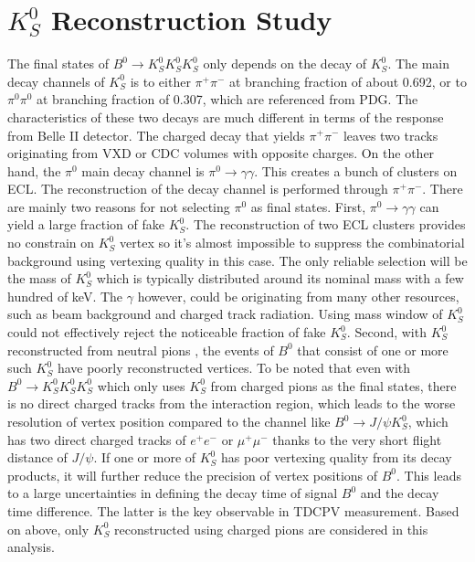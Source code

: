\chapter{$K_S^0$ Reconstruction Study}

The final states of $B^0 \to K_S^0  K_S^0  K_S^0 $ only depends on the decay of $K_S^0$. The main decay channels of $K_S^0$ is to either $\pi^+ \pi^-$ at branching fraction of about 0.692, or to $\pi^0 \pi^0$ at branching fraction of 0.307, which are referenced from PDG\cite{pdg}.
 The characteristics of these two decays are much different in terms of the response from Belle II detector. The charged decay that yields  $\pi^+ \pi^-$ leaves two tracks originating from VXD or CDC volumes with opposite charges. On the other hand, the $\pi^0$ main decay channel is $\pi^0 \to \gamma \gamma$. This creates a bunch of clusters on ECL. The reconstruction of the decay channel is performed through  $\pi^+ \pi^-$. There are mainly two reasons for not selecting $\pi^0$ as final states.
 First, $\pi^0 \to \gamma \gamma$ can yield a large fraction of fake $K_S^0$. The reconstruction of two ECL clusters provides no constrain on $K_S^0$ vertex so it's almost impossible to suppress the combinatorial background using vertexing quality in this case. The only reliable selection will be the mass of $K_S^0$ which is typically distributed around its nominal mass with a few hundred of keV. 
 The $\gamma$ however, could be originating from many other resources, such as beam background and charged track radiation. Using mass window of $K_S^0$ could not effectively reject the noticeable fraction of fake $K_S^0$. Second, with $K_S^0$ reconstructed from neutral pions , the events of $B^0$ that consist of one or more such $K_S^0$ have poorly reconstructed vertices. To be noted that even with $B^0 \to K_S^0  K_S^0  K_S^0 $ which only uses $K_S^0$ from charged pions as the final states, there is no direct charged tracks from the interaction region, which leads to the worse resolution of vertex position compared to the channel like $B^0 \to J/\psi K_S^0$, which has two direct charged tracks of $e^+e^-$ or $\mu^+ \mu^-$ thanks to the very short flight distance of $J/\psi$. If one or more of $K^0_S$ has poor vertexing quality from its decay products, it will further reduce the precision of vertex positions of $B^0$. This leads to a large uncertainties in defining the decay time of signal $B^0$ and the decay time difference. The latter is the key observable in TDCPV measurement. Based on above, only $K_S^0$ reconstructed using charged pions are considered in this analysis.
 
